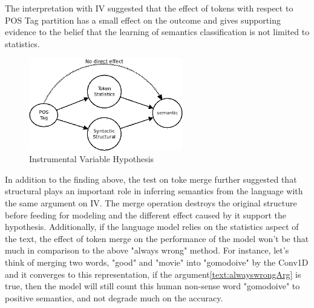\documentclass[12pt]{article}
\begin{document}
The interpretation with IV suggested that the effect of tokens with respect to POS Tag partition has a small effect on the outcome and gives supporting evidence to the belief that the learning of semantics classification is not limited to statistics. 
\begin{figure} [!h]
\begin{center}
\includegraphics[width=0.6\textwidth]{figures/combin_IV.png}
\caption{Instrumental Variable Hypothesis}
\label{fig:combinIV}
\end{center}
\end{figure}

In addition to the finding above, the test on toke merge further suggested that structural plays an important role in inferring semantics from the language with the same argument on IV. The merge operation destroys the original structure before feeding for modeling and the different effect caused by it support the hypothesis. Additionally, if the language model relies on the statistics aspect of the text, the effect of token merge on the performance of the model won't be that much in comparison to the above "always wrong" method. For instance, let's think of merging two words, "good" and "movie" into "gomodoive" by the Conv1D and it converges to this representation, if the argument\ref{text:alwayswrongArg} is true, then the model will still count this human non-sense word "gomodoive" to positive semantics, and not degrade much on the accuracy. 
\end{document}
